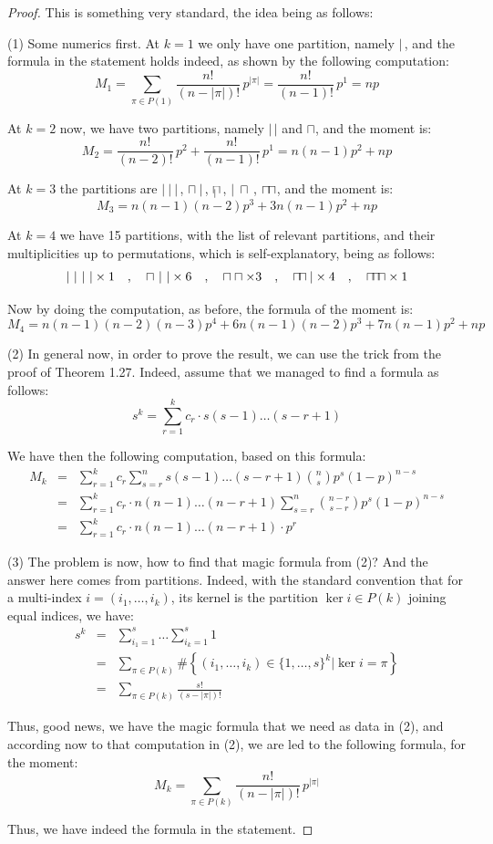 \documentclass[12pt]{amsbook}
\begin{document}
\begin{proof}
This is something very standard, the idea being as follows:

\medskip

(1) Some numerics first. At $k=1$ we only have one partition, namely $|$\,, and the formula in the statement holds indeed, as shown by the following computation:
$$M_1=\sum_{\pi\in P(1)}\frac{n!}{(n-|\pi|)!}\,p^{|\pi|}
=\frac{n!}{(n-1)!}\,p^1
=np$$

At $k=2$ now, we have two partitions, namely $|\,|$ and $\sqcap$, and the moment is:
$$M_2=\frac{n!}{(n-2)!}\,p^2+\frac{n!}{(n-1)!}\,p^1
=n(n-1)p^2+np$$

At $k=3$ the partitions are $|\ |\ |$\,, $\sqcap\ |$\,, $\sqcap\hskip-3.2mm{\ }_|$\,\,, $|\ \sqcap$\,, $\sqcap\hskip-0.7mm\sqcap$, and the moment is:
$$M_3=n(n-1)(n-2)p^3+3n(n-1)p^2+np$$

At $k=4$ we have 15 partitions, with the list of relevant partitions, and their multiplicities up to permutations, which is self-explanatory, being as follows:
$$|\ |\ |\ |\times1\quad,\quad \sqcap\ |\ |\times 6\quad,\quad \sqcap\sqcap\times 3
\quad,\quad \sqcap\hskip-1.6mm\sqcap|\times4\quad,\quad \sqcap\hskip-1.6mm\sqcap\hskip-1.6mm\sqcap\times1$$

Now by doing the computation, as before, the formula of the moment is:
$$M_4=n(n-1)(n-2)(n-3)p^4+6n(n-1)(n-2)p^3+7n(n-1)p^2+np$$

(2) In general now, in order to prove the result, we can use the trick from the proof of Theorem 1.27. Indeed, assume that we managed to find a formula as follows:
$$s^k=\sum_{r=1}^kc_r\cdot s(s-1)\ldots(s-r+1)$$

We have then the following computation, based on this formula:
\begin{eqnarray*}
M_k
&=&\sum_{r=1}^kc_r\sum_{s=r}^ns(s-1)\ldots(s-r+1)\binom{n}{s}p^s(1-p)^{n-s}\\
&=&\sum_{r=1}^kc_r\cdot n(n-1)\ldots(n-r+1)\sum_{s=r}^n\binom{n-r}{s-r}p^s(1-p)^{n-s}\\
&=&\sum_{r=1}^kc_r\cdot n(n-1)\ldots(n-r+1)\cdot p^r
\end{eqnarray*}

(3) The problem is now, how to find that magic formula from (2)? And the answer here comes from partitions. Indeed, with the standard convention that for a multi-index $i=(i_1,\ldots,i_k)$, its kernel is the partition $\ker i\in P(k)$ joining equal indices, we have:
\begin{eqnarray*}
s^k
&=&\sum_{i_1=1}^s\ldots\sum_{i_k=1}^s1\\
&=&\sum_{\pi\in P(k)}\#\left\{(i_1,\ldots,i_k)\in\{1,\ldots,s\}^k\Big|\ker i=\pi\right\}\\
&=&\sum_{\pi\in P(k)}\frac{s!}{(s-|\pi|)!}
\end{eqnarray*}

Thus, good news, we have the magic formula that we need as data in (2), and according now to that computation in (2), we are led to the following formula, for the moment:
$$M_k=\sum_{\pi\in P(k)}\frac{n!}{(n-|\pi|)!}\,p^{|\pi|}$$

Thus, we have indeed the formula in the statement.
\end{proof}
\end{document}
